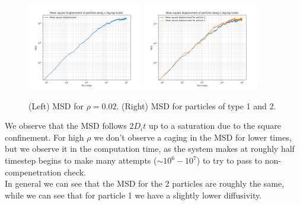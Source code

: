 \begin{figure}[ht]
    \centering
    \includegraphics[width=0.45\textwidth]{FIG/ex13/MSD_particle_number200.png} 
    \hspace{0.05\textwidth}
    \includegraphics[width=0.45\textwidth]{FIG/ex13/MSD_particle_number200_particle1.png}
    \caption{(Left) MSD for $\rho = 0.02$. (Right) MSD for particles of type 1 and 2.}
    \label{fig:combined2}
\end{figure}



We observe that the MSD follows $2D_i t$ up to a saturation due to the square confinement. For high $\rho$ we don't observe a caging in the MSD for lower times, 
but we observe it in the computation time, as the system makes at roughly half timestep begins to make many attempts ($\sim 10^6-10^{7}$) to try to pass to non-compenetration check. \\
In general we can see that the MSD for the 2 particles are roughly the same, while we can see that for particle 1 we have a slightly lower diffusivity.
